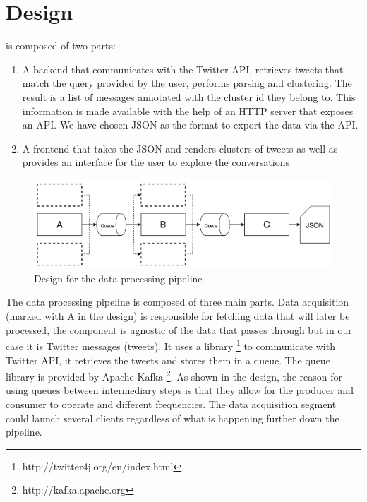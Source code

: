 \chapter{Design}
\label{chapter:design}

{\project} is composed of two parts:
\begin{enumerate}
  \item A backend that communicates with the Twitter API, retrieves tweets that match the query provided by the user, performs parsing and clustering. The result is a list of messages annotated with the cluster id they belong to. This information is made available with the help of an HTTP server that exposes an API. We have chosen JSON as the format to export the data via the API.
  \item A frontend that takes the JSON and renders clusters of tweets as well as provides an interface for the user to explore the conversations 
\end{enumerate}

\begin{figure}[ht!]
\centering
\includegraphics[width=\textwidth,height=\textheight,keepaspectratio]{src/img/design.png}
\caption{Design for the data processing pipeline\label{overflow}}
\end{figure}

The data processing pipeline is composed of three main parts. Data acquisition (marked with A in the design) is responsible for fetching data that will later be processed, the component is agnostic of the data that passes through but in our case it is Twitter messages (tweets). It uses a library \footnote{http://twitter4j.org/en/index.html} to communicate with Twitter API, it retrieves the tweets and stores them in a queue. The queue library is provided by Apache Kafka \footnote{http://kafka.apache.org}. As shown in the design, the reason for using queues between intermediary steps is that they allow for the producer and consumer to operate and different frequencies. The data acquisition segment could launch several clients regardless of what is happening further down the pipeline.

